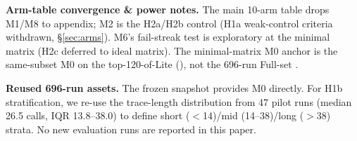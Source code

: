 \textbf{Arm-table convergence \& power notes.} The main 10-arm table drops M1/M8 to appendix; M2 is the H2a/H2b control (H1a weak-control criteria withdrawn, \S\ref{sec:arms}). M6's fail-streak test is exploratory at the minimal matrix (H2c deferred to ideal matrix). The minimal-matrix M0 anchor is the same-subset M0 on the top-120-of-Lite (\TBD), not the 696-run Full-set \MzeroPass{}.

\textbf{Reused 696-run assets.} The frozen snapshot provides M0 directly. For H1b stratification, we re-use the trace-length distribution from 47 pilot runs (median 26.5 calls, IQR 13.8--38.0) to define short ($<$14)/mid (14--38)/long ($>$38) strata. No new evaluation runs are reported in this paper.
